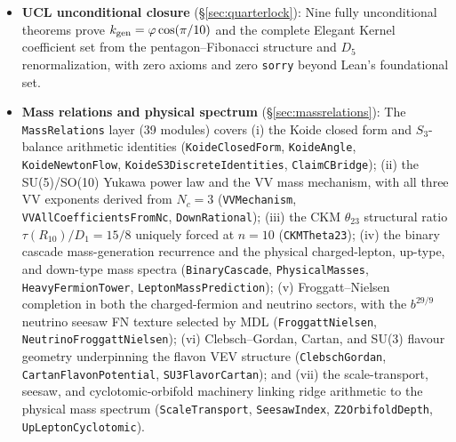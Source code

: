 \documentclass[11pt,a4paper]{article}
\theoremstyle{definition}
\begin{document}
\begin{itemize}[nosep]
  the divisor hyperbola is differentiable with derivative
  $13R/q^2 + 2q - 6 \ge 22$ on the valid shell---a machine-checked
  uniform magnification bound for sieve applications.
\item \textbf{UCL unconditional closure} (\S\ref{sec:quarterlock}):
  Nine fully unconditional theorems prove $k_{\rm gen} = \varphi\cos(\pi/10)$ and the
  complete Elegant Kernel coefficient set from the pentagon--Fibonacci
  structure and $D_5$ renormalization, with zero axioms and zero
  \texttt{sorry} beyond Lean's foundational set.
\item \textbf{Mass relations and physical spectrum} (\S\ref{sec:massrelations}):
  The \texttt{MassRelations} layer (39 modules) covers
  (i) the Koide closed form and $S_3$-balance arithmetic identities
  (\texttt{KoideClosedForm}, \texttt{KoideAngle}, \texttt{KoideNewtonFlow},
  \texttt{KoideS3DiscreteIdentities}, \texttt{ClaimCBridge});
  (ii) the SU(5)/SO(10) Yukawa power law and the VV mass mechanism, with
  all three VV exponents derived from $N_c = 3$
  (\texttt{VVMechanism}, \texttt{VVAllCoefficientsFromNc}, \texttt{DownRational});
  (iii) the CKM $\theta_{23}$ structural ratio
  $\tau(R_{10})/D_1 = 15/8$ uniquely forced at $n = 10$
  (\texttt{CKMTheta23});
  (iv) the binary cascade mass-generation recurrence and the physical
  charged-lepton, up-type, and down-type mass spectra
  (\texttt{BinaryCascade}, \texttt{PhysicalMasses}, \texttt{HeavyFermionTower},
  \texttt{LeptonMassPrediction});
  (v) Froggatt--Nielsen completion in both the charged-fermion and
  neutrino sectors, with the $b^{29/9}$ neutrino seesaw FN texture
  selected by MDL
  (\texttt{FroggattNielsen}, \texttt{NeutrinoFroggattNielsen});
  (vi) Clebsch--Gordan, Cartan, and SU(3) flavour geometry underpinning
  the flavon VEV structure
  (\texttt{ClebschGordan}, \texttt{CartanFlavonPotential}, \texttt{SU3FlavorCartan});
  and (vii) the scale-transport, seesaw, and cyclotomic-orbifold
  machinery linking ridge arithmetic to the physical mass spectrum
  (\texttt{ScaleTransport}, \texttt{SeesawIndex}, \texttt{Z2OrbifoldDepth},
  \texttt{UpLeptonCyclotomic}).
\end{itemize}
\end{document}

